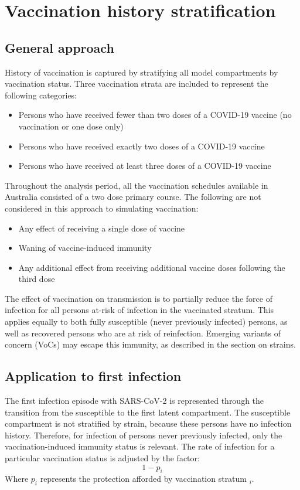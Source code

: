 \section{Vaccination history stratification}
\subsection{General approach}
History of vaccination is captured by stratifying all model compartments by vaccination status.
Three vaccination strata are included to represent the following categories:
\begin{itemize}
    \item Persons who have received fewer than two doses of a COVID-19 vaccine (no vaccination or one dose only)
    \item Persons who have received exactly two doses of a COVID-19 vaccine
    \item Persons who have received at least three doses of a COVID-19 vaccine
\end{itemize}
Throughout the analysis period, all the vaccination schedules available in Australia
consisted of a two dose primary course.
The following are not considered in this approach to simulating vaccination:
\begin{itemize}
    \item Any effect of receiving a single dose of vaccine
    \item Waning of vaccine-induced immunity
    \item Any additional effect from receiving additional vaccine doses following the third dose
\end{itemize}
The effect of vaccination on transmission is to partially reduce 
the force of infection for all persons at-risk of infection in the vaccinated stratum.
This applies equally to both fully susceptible (never previously infected) persons,
as well as recovered persons who are at risk of reinfection.
Emerging variants of concern (VoCs) may escape this immunity, as described in the section on strains.

\subsection{Application to first infection}
The first infection episode with SARS-CoV-2 
is represented through the transition from the susceptible
to the first latent compartment.
The susceptible compartment is not stratified by strain,
because these persons have no infection history.
Therefore, for infection of persons never previously infected,
only the vaccination-induced immunity status is relevant.
The rate of infection for a particular vaccination status is adjusted by the factor:
\[1 - p_{i}\]
Where \(p_{i}\) represents the protection afforded by vaccination stratum \(_{i}\).

